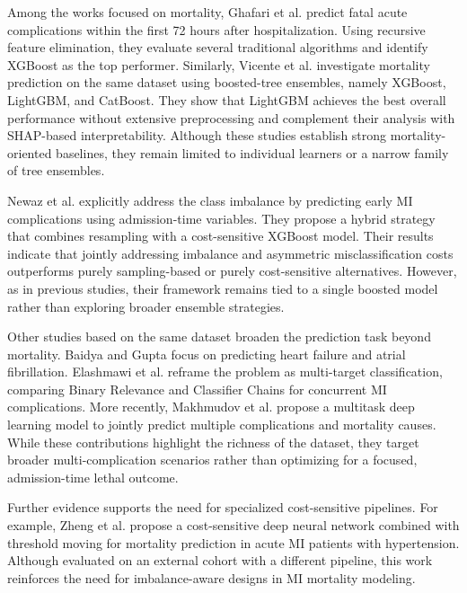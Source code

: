 \documentclass[conference]{IEEEtran}
\begin{document}
Among the works focused on mortality, Ghafari et al. \cite{ghafari2023prediction} predict fatal acute complications within the first 72 hours after hospitalization. Using recursive feature elimination, they evaluate several traditional algorithms and identify XGBoost as the top performer. Similarly, Vicente et al. \cite{vicente2024explainablelightgbmapproachpredicting} investigate mortality prediction on the same dataset using boosted-tree ensembles, namely XGBoost, LightGBM, and CatBoost. They show that LightGBM achieves the best overall performance without extensive preprocessing and complement their analysis with SHAP-based interpretability. Although these studies establish strong mortality-oriented baselines, they remain limited to individual learners or a narrow family of tree ensembles.

Newaz et al. \cite{NEWAZ2023101361} explicitly address the class imbalance by predicting early MI complications using admission-time variables. They propose a hybrid strategy that combines resampling with a cost-sensitive XGBoost model. Their results indicate that jointly addressing imbalance and asymmetric misclassification costs outperforms purely sampling-based or purely cost-sensitive alternatives. However, as in previous studies, their framework remains tied to a single boosted model rather than exploring broader ensemble strategies.

Other studies based on the same dataset broaden the prediction task beyond mortality. Baidya and Gupta \cite{Baidya2024} focus on predicting heart failure and atrial fibrillation. Elashmawi et al. \cite{Elashmawi2024} reframe the problem as multi-target classification, comparing Binary Relevance and Classifier Chains for concurrent MI complications. More recently, Makhmudov et al. \cite{Makhmudov2025} propose a multitask deep learning model to jointly predict multiple complications and mortality causes. While these contributions highlight the richness of the dataset, they target broader multi-complication scenarios rather than optimizing for a focused, admission-time lethal outcome.

Further evidence supports the need for specialized cost-sensitive pipelines. For example, Zheng et al. \cite{zheng2024cost} propose a cost-sensitive deep neural network combined with threshold moving for mortality prediction in acute MI patients with hypertension. Although evaluated on an external cohort with a different pipeline, this work reinforces the need for imbalance-aware designs in MI mortality modeling.
\end{document}
